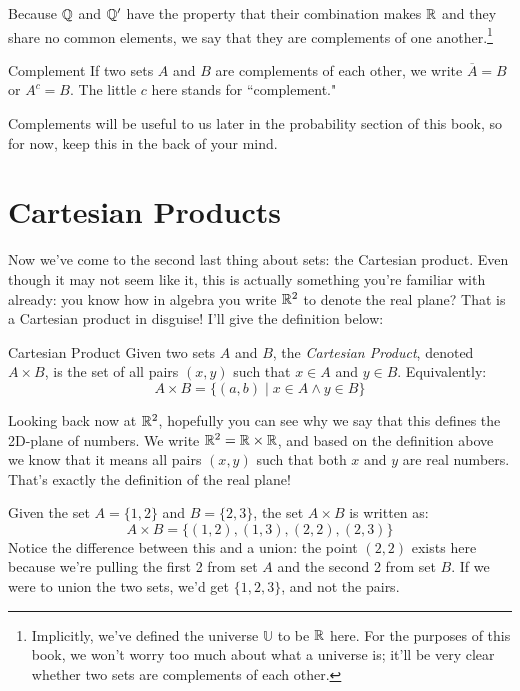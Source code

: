 Because \( \mathbb Q  \) and \( \mathbb Q' \) have the property that their combination makes \( \mathbb R \) and they share no 
common elements, we say that they are complements of one another.\footnote{Implicitly, we've defined the universe
\( \mathbb U \) to be \( \mathbb R \) here. For the purposes of this book, we won't worry too much about what a universe is; 
it'll be very clear whether two sets are complements of each other.} 
\begin{notation}{Complement}{}
	If two sets \( A \) and \( B \) are complements of each other, we write \( \overline A = B \) or \( A^{c} = B \). 
	The little \( c \) here stands for ``complement."
\end{notation}

Complements will be useful to us later in the probability section of this book, 
so for now, keep this in the back of your mind. 
\section{Cartesian Products}
Now we've come to the second last thing about sets: the Cartesian product. Even though it may not seem like it, 
this is actually something you're familiar with already: you know how in algebra you write \( \mathbb R^2 \) to denote 
the real plane? That is a Cartesian product in disguise! I'll give the definition below:

\begin{definition}{Cartesian Product}{}
	Given two sets \( A \) and \( B \), the \textit{Cartesian Product}, denoted \( A \times B \), is the set of 
	all pairs \( (x, y) \) such that \( x \in A \) and \( y \in B \). Equivalently:
	\[
	A \times B = \{(a, b) \mid x \in A \land y \in B\} 
	\] 
\end{definition}
Looking back now at \( \mathbb R^2 \), hopefully you can see why we say that this defines the 2D-plane of numbers. We 
write \( \mathbb R^2 = \mathbb R \times \mathbb R \), and based on the definition above we know that it means all pairs 
\( (x, y) \) such that both \( x \) and \( y \) are real numbers. That's exactly the definition of the 
real plane!
\begin{example}{}{}
	Given the set \( A = \{1, 2\}  \) and \( B = \{2, 3\} \), the set \( A \times B \) is written as:
	\[
	A \times B = \{(1, 2), (1, 3), (2, 2), (2, 3)\} 
	\] 
	Notice the difference between this and a union: the point \( (2, 2) \) exists here because we're pulling 
	the first 2 from set \( A \) and the second 2 from set \( B \). If we were to union the two sets, 
	we'd get \( \{1, 2, 3\}  \), and not the pairs. 
\end{example}
 

